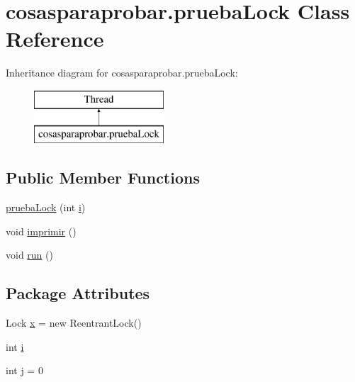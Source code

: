 \hypertarget{classcosasparaprobar_1_1prueba_lock}{}\section{cosasparaprobar.\+prueba\+Lock Class Reference}
\label{classcosasparaprobar_1_1prueba_lock}
Inheritance diagram for cosasparaprobar.\+prueba\+Lock\+:\begin{figure}[H]
\begin{center}
\leavevmode
\includegraphics[height=2.000000cm]{classcosasparaprobar_1_1prueba_lock}
\end{center}
\end{figure}
\subsection*{Public Member Functions}
\begin{DoxyCompactItemize}
\item 
\mbox{\hyperlink{classcosasparaprobar_1_1prueba_lock_af5d0c268d078ba0b6d6a8ffec9c6ce26}{prueba\+Lock}} (int \mbox{\hyperlink{classcosasparaprobar_1_1prueba_lock_a09994290f41e771d38e58b3fa49a2423}{i}})
\item 
void \mbox{\hyperlink{classcosasparaprobar_1_1prueba_lock_aec34354c84889e047b1c06ed12cdebe8}{imprimir}} ()
\item 
void \mbox{\hyperlink{classcosasparaprobar_1_1prueba_lock_abb5d8bc76365e77760daec389ab86b2e}{run}} ()
\end{DoxyCompactItemize}
\subsection*{Package Attributes}
\begin{DoxyCompactItemize}
\item 
Lock \mbox{\hyperlink{classcosasparaprobar_1_1prueba_lock_acc25c3cf5a84e4663118437986227e03}{x}} = new Reentrant\+Lock()
\item 
int \mbox{\hyperlink{classcosasparaprobar_1_1prueba_lock_a09994290f41e771d38e58b3fa49a2423}{i}}
\item 
int \mbox{\hyperlink{classcosasparaprobar_1_1prueba_lock_ad8aaf12f51650b7b83e28512af4bf831}{j}} = 0
\end{DoxyCompactItemize}


